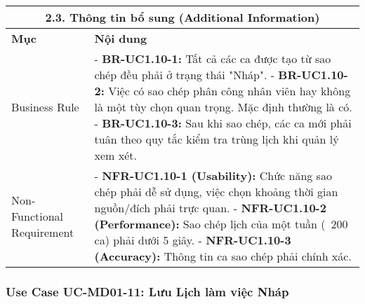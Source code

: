 \begin{longtable}{|m{4cm}|p{11cm}|}
\hline
\multicolumn{2}{|c|}{\textbf{2.3. Thông tin bổ sung (Additional Information)}} \\
\hline
\textbf{Mục} & \textbf{Nội dung} \\
\hline
Business Rule & - \textbf{BR-UC1.10-1:} Tất cả các ca được tạo từ sao chép đều phải ở trạng thái "Nháp". \newline - \textbf{BR-UC1.10-2:} Việc có sao chép phân công nhân viên hay không là một tùy chọn quan trọng. Mặc định thường là có. \newline - \textbf{BR-UC1.10-3:} Sau khi sao chép, các ca mới phải tuân theo quy tắc kiểm tra trùng lịch khi quản lý xem xét. \\
\hline
Non-Functional Requirement & - \textbf{NFR-UC1.10-1 (Usability):} Chức năng sao chép phải dễ sử dụng, việc chọn khoảng thời gian nguồn/đích phải trực quan. \newline - \textbf{NFR-UC1.10-2 (Performance):} Sao chép lịch của một tuần (~200 ca) phải dưới 5 giây. \newline - \textbf{NFR-UC1.10-3 (Accuracy):} Thông tin ca sao chép phải chính xác. \\
\hline
\end{longtable}

\subsubsection{Use Case UC-MD01-11: Lưu Lịch làm việc Nháp}

